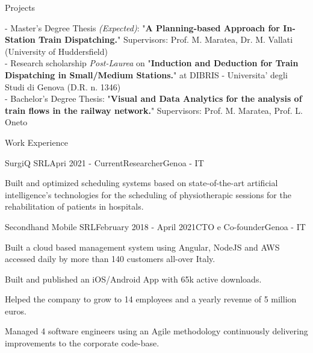 \documentclass{resume} %
\begin{document}
\begin{rSection}{Projects}

- Master's Degree Thesis \textit{(Expected)}: "\textbf{A Planning-based Approach for In-Station Train Dispatching.}" Supervisors: Prof. M. Maratea, Dr. M. Vallati (University of Huddersfield)\\
- Research scholarship \textit{Post-Laurea} on "\textbf{Induction and Deduction for Train Dispatching in Small/Medium Stations.}" at DIBRIS - Universita' degli Studi di Genova (D.R. n. 1346) \\
- Bachelor's Degree Thesis: "\textbf{Visual and Data Analytics for the analysis of train flows in the railway network.}" Supervisors: Prof. M. Maratea, Prof. L. Oneto
	
\end{rSection}


\begin{rSection}{Work Experience}


\begin{rSubsection}{SurgiQ SRL}{Apri 2021 - Current}{Researcher}{Genoa - IT}
\item Built and optimized scheduling systems based on state-of-the-art artificial intelligence's technologies for the scheduling of physiotherapic sessions for the rehabilitation of patients in hospitals.
\end{rSubsection}

\begin{rSubsection}{Secondhand Mobile SRL}{February 2018 - April 2021}{CTO e Co-founder}{Genoa - IT}
\item Built a cloud based management system using Angular, NodeJS and AWS accessed daily by more than 140 customers all-over Italy.
\item Built and published an iOS/Android App with 65k active downloads.
\item Helped the company to grow to 14 employees and a yearly revenue of 5 million euros.
\item Managed 4 software engineers using an Agile methodology continuously delivering improvements to the corporate code-base.
\end{rSubsection}




\end{rSection}



\end{document}
